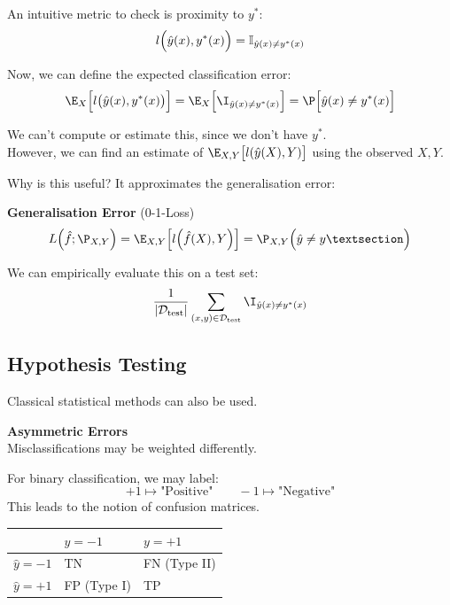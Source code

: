 An intuitive metric to check is proximity to $y^*$:\\
$$
    l\Bigl( \hat{y}(x),y^*(x) \Bigr) = \mathbb{I}_{\hat{y}(x)\neq y^*(x)}
$$

Now, we can define the expected classification error:\\
$$
    \E_X\Bigl[ l\bigl( \hat{y}(x), y^*(x) \bigr) \Bigr] = \E_X\Bigl[ \I_{\hat{y}(x) \neq y^*(x)} \Bigr] = \P\Bigl[ \hat{y}(x) \neq y^*(x) \Bigr]
$$

We can't compute or estimate this, since we don't have $y^*$. \\
However, we can find an estimate of $\E_{X,Y}\bigl[ l(\hat{y}(X),Y) \bigr]$ using the observed $X,Y$.

Why is this useful? It approximates the generalisation error:

 \textbf{Generalisation Error} (0-1-Loss)
$$
    L\Bigl( \hat{f};\P_{X,Y} \Bigr) = \E_{X,Y}\Bigl[ l\Bigl( \hat{f}(X),Y \Bigr) \Bigr] = \P_{X,Y}\Bigl( \hat{y}\neq y§ \Bigr)
$$

We can empirically evaluate this on a test set:
$$
    \frac{1}{|\mathcal{D}_\text{test}|} \sum_{(x,y)\in\mathcal{D}_\text{test}} \I_{\hat{y}(x)\neq y^*(x)}
$$

\newpage

\subsection{Hypothesis Testing}
Classical statistical methods can also be used.

 \textbf{Asymmetric Errors}\\
Misclassifications may be weighted differently.\\

For binary classification, we may label:
$$
    +1 \mapsto \text{"Positive"} \qquad -1 \mapsto \text{"Negative"}
$$
This leads to the notion of confusion matrices.

\begin{center}
    \begin{tabular}{l|ll}
                        & $y=-1$        & $y=+1$        \\
        \hline
        $\hat{y}= -1$   & TN            & FN (Type II)  \\
        $\hat{y}= +1$   & FP (Type I)   & TP
        
    \end{tabular}
\end{center}

